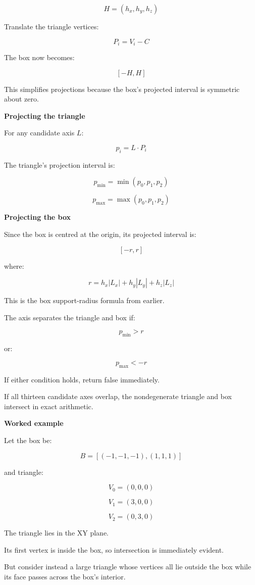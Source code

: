 \[
H=(h_x,h_y,h_z)
\]

Translate the triangle vertices:

\[
\boxed{ P_i=V_i-C }
\]

The box now becomes:

\[
[-H,H]
\]

This simplifies projections because the box's projected interval is symmetric about zero.

\textbf{Projecting the triangle}

For any candidate axis \(L\):

\[
p_i=L\cdot P_i
\]

The triangle's projection interval is:

\[
\boxed{ p_{\min}=\min(p_0,p_1,p_2) }
\]

\[
\boxed{ p_{\max}=\max(p_0,p_1,p_2) }
\]

\textbf{Projecting the box}

Since the box is centred at the origin, its projected interval is:

\[
[-r,r]
\]

where:

\[
\boxed{ r=h_x|L_x|+h_y|L_y|+h_z|L_z| }
\]

This is the box support-radius formula from earlier.

The axis separates the triangle and box if:

\[
\boxed{ p_{\min}>r }
\]

or:

\[
\boxed{ p_{\max}<-r }
\]

If either condition holds, return false immediately.

If all thirteen candidate axes overlap, the nondegenerate triangle and box intersect in exact arithmetic.

\textbf{Worked example}

Let the box be:

\[
B=[(-1,-1,-1),(1,1,1)]
\]

and triangle:

\[
V_0=(0,0,0)
\]

\[
V_1=(3,0,0)
\]

\[
V_2=(0,3,0)
\]

The triangle lies in the XY plane.

Its first vertex is inside the box, so intersection is immediately evident.

But consider instead a large triangle whose vertices all lie outside the box while its face passes across the box's interior.

